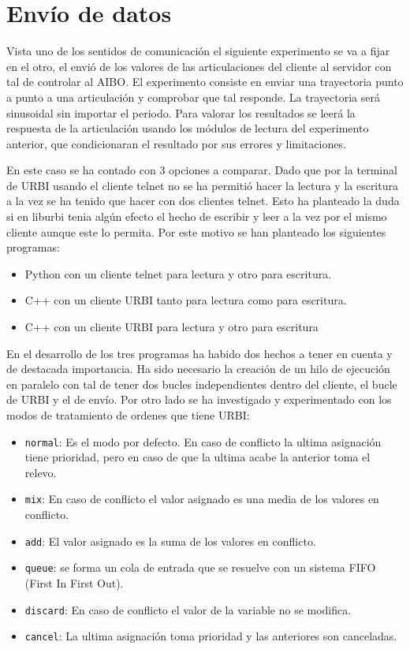 \documentclass[12pt,a4paper,final,twoside]{book}
\begin{document}
\section{Envío de datos}\label{secenvdades}
Vista uno de los sentidos de comunicación el siguiente experimento se va a fijar en el otro, el envió de los valores de las articulaciones del cliente al servidor con tal de controlar al AIBO.
El experimento consiste en enviar una trayectoria punto a punto a una articulación y comprobar que tal responde. La trayectoria será sinusoidal sin importar el periodo. Para valorar los resultados se leerá la respuesta de la articulación usando los módulos de lectura del experimento anterior, que condicionaran el resultado por sus errores y limitaciones. 

En este caso se ha contado con 3 opciones a comparar. Dado que por la terminal de URBI usando el cliente telnet no se ha permitió hacer la lectura y la escritura a la vez se ha tenido que hacer con dos clientes telnet. Esto ha planteado la duda si en liburbi tenia algún efecto el hecho de escribir y leer a la vez por el mismo cliente aunque este lo permita. Por este motivo se han planteado los siguientes programas:
\begin{itemize}
\item Python con un cliente telnet para lectura y otro para escritura.
\item C++ con un cliente URBI tanto para lectura como para escritura.
\item C++ con un cliente URBI para lectura y otro para escritura
\end{itemize}

En el desarrollo de los tres programas ha habido dos hechos a tener en cuenta y de destacada importancia.
Ha sido necesario la creación de un hilo de ejecución en paralelo con tal de tener dos bucles independientes dentro del cliente, el bucle de URBI y el de envío.
Por otro lado se ha investigado y experimentado con los modos de tratamiento  de ordenes que tiene URBI:
\begin{itemize}
\item \texttt{normal}: Es el modo por defecto. En caso de conflicto la ultima asignación tiene prioridad, pero en caso de que la ultima acabe la anterior toma el relevo.
\item \texttt{mix}: En caso de conflicto el valor asignado es una media de los valores en conflicto.
\item \texttt{add}: El valor asignado es la suma de los valores en conflicto.
\item \texttt{queue}: se forma un cola de entrada que se resuelve con un sistema FIFO (First In First Out).
\item \texttt{discard}: En caso de conflicto el valor de la variable no se modifica.
\item \texttt{cancel}: La ultima asignación toma prioridad y las anteriores son canceladas. 
\end{itemize}
\end{document}
